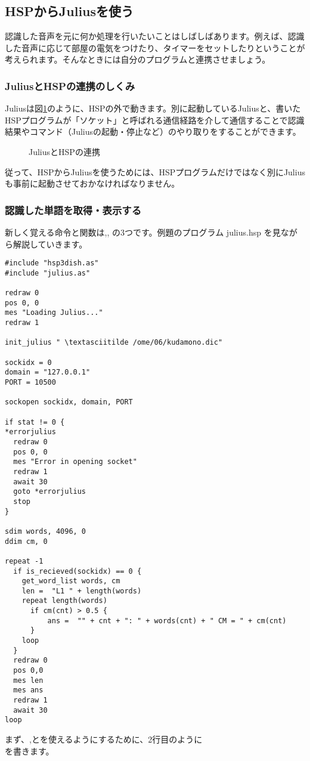 \subsection{HSPからJuliusを使う}
認識した音声を元に何か処理を行いたいことはしばしばあります。例えば、認識した音声に応じて部屋の電気をつけたり、タイマーをセットしたりということが考えられます。そんなときには自分のプログラムと連携させましょう。
\subsubsection{JuliusとHSPの連携のしくみ}
Juliusは図\ref{JuliusとHSPの連携}のように、HSPの外で動きます。別に起動しているJuliusと、書いたHSPプログラムが「ソケット」と呼ばれる通信経路を介して通信することで認識結果やコマンド（Juliusの起動・停止など）のやり取りをすることができます。
\begin{figure}[H]
\begin{center}
    
    \caption{JuliusとHSPの連携}
    \label{JuliusとHSPの連携}
\end{center}
\end{figure}
従って、HSPからJuliusを使うためには、HSPプログラムだけではなく別にJuliusも事前に起動させておかなければなりません。

\subsubsection{認識した単語を取得・表示する}
新しく覚える命令と関数は,,  の3つです。例題のプログラム julius.hsp を見ながら解説していきます。\\
\begin{lstlisting}[caption=julius.hsp,label=julius.hsp]
#include "hsp3dish.as"
#include "julius.as"

redraw 0
pos 0, 0
mes "Loading Julius..."
redraw 1

init_julius " \textasciitilde /ome/06/kudamono.dic"

sockidx = 0
domain = "127.0.0.1"
PORT = 10500

sockopen sockidx, domain, PORT

if stat != 0 {
*errorjulius
  redraw 0
  pos 0, 0
  mes "Error in opening socket"
  redraw 1
  await 30
  goto *errorjulius
  stop
}

sdim words, 4096, 0
ddim cm, 0

repeat -1
  if is_recieved(sockidx) == 0 {
    get_word_list words, cm
    len =  "L1 " + length(words)
    repeat length(words)
      if cm(cnt) > 0.5 {
          ans =  "" + cnt + ": " + words(cnt) + " CM = " + cm(cnt)
      }
    loop
  }
  redraw 0
  pos 0,0
  mes len
  mes ans
  redraw 1
  await 30
loop
\end{lstlisting}
まず、,とを使えるようにするために、2行目のように\\
を書きます。

